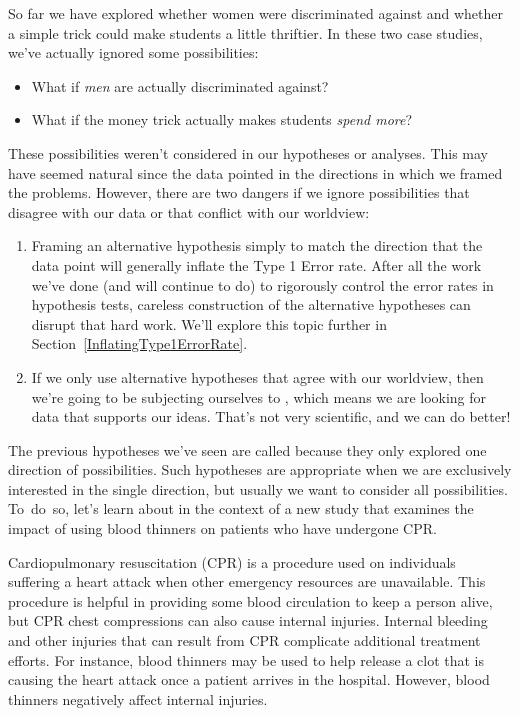 So far we have explored whether women were discriminated against and whether a simple trick could make students a little thriftier. In these two case studies, we've actually ignored some possibilities:
\begin{itemize}
\item What if \emph{men} are actually discriminated against?
\item What if the money trick actually makes students \emph{spend more}?
\end{itemize}
These possibilities weren't considered in our hypotheses or analyses. This may have seemed natural since the data pointed in the directions in which we framed the problems. However, there are two dangers if we ignore possibilities that disagree with our data or that conflict with our worldview:
\begin{enumerate}
\item Framing an alternative hypothesis simply to match the direction that the data point will generally inflate the Type 1 Error rate. After all the work we've done (and will continue to do) to rigorously control the error rates in hypothesis tests, careless construction of the alternative hypotheses can disrupt that hard work. We'll explore this topic further in Section~\ref{InflatingType1ErrorRate}.
\item If we only use alternative hypotheses that agree with our worldview, then we're going to be subjecting ourselves to , which means we are looking for data that supports our ideas. That's not very scientific, and we can do better!
\end{enumerate}
The previous hypotheses we've seen are called  because they only explored one direction of possibilities. Such hypotheses are appropriate when we are exclusively interested in the single direction, but usually we want to consider all possibilities. To~do~so, let's learn about  in the context of a new study that examines the impact of using blood thinners on patients who have undergone CPR.


Cardiopulmonary resuscitation (CPR) is a procedure used on individuals suffering a heart attack when other emergency resources are unavailable. This procedure is helpful in providing some blood circulation to keep a person alive, but CPR chest compressions can also cause internal injuries. Internal bleeding and other injuries that can result from CPR complicate additional treatment efforts. For instance, blood thinners may be used to help release a clot that is causing the heart attack once a patient arrives in the hospital. However, blood thinners negatively affect internal injuries.

